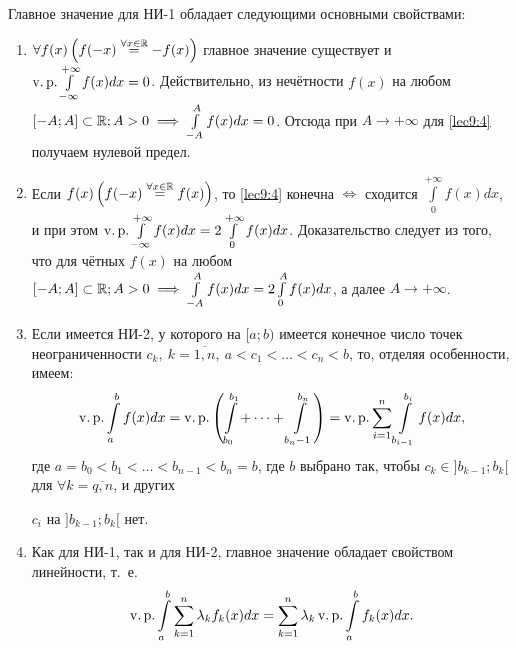 \documentclass[../../main.tex]{subfiles}
\begin{document}
Главное значение для НИ-1 обладает следующими основными свойствами:
\begin{enumerate}[label=\arabic*$^{\circ}$.]
\item
$ \forall f(x) \left(f(-x) \stackrel{\forall x \in \mathbb{R}}{=} -f(x) \right) $
главное значение существует и $\operatorname{v.p.}\int\limits_{-\infty}^{+\infty}f(x)dx=0$.
Действительно, из нечётности $ f(x) $ на любом $ [-A; A] \subset \mathbb{R}; A > 0 
\implies \int\limits_{-A}^A f(x) dx = 0$. Отсюда при $ A \to +\infty $ для
\eqref{lec9:4} получаем нулевой предел.
\item
Если $ f(x) \left(f(-x) \stackrel{\forall x \in \mathbb{R}}{=} f(x) \right) $, то
\eqref{lec9:4} конечна $ \iff $ сходится $ \int\limits_0^{+\infty}f(x)dx $, и 
при этом $ \operatorname{v.p.} \int\limits_{-\infty}^{+\infty} f(x) dx = 
2\int\limits_0^{+\infty} f(x) dx$. Доказательство следует из того, что для
чётных $ f(x) $ на любом $ [-A; A] \subset \mathbb{R}; A > 0 
\implies \int\limits_{-A}^A f(x) dx = 2\int\limits_0^A f(x) dx$, а далее 
$ A \to +\infty $.
\item
Если имеется НИ-2, у которого на $ [a; b) $ имеется конечное число точек
неограниченности $ c_k,\ k = \overline{1,n},\ a < c_1 < \dots <
c_n < b $, то, отделяя особенности, имеем: \[\operatorname{v.p.} \int\limits_a^b f(x) dx = 
\operatorname{v.p.} \left(\int\limits_{b_0}^{b_1} + \dots + \int\limits_{b_n - 1}^{b_n}
\right) = \operatorname{v.p.} \sum\limits_{i = 1}^n \int\limits_{b_{i - 1}}^{b_i} f(x)dx, \]
где $ a = b_0 < b_1 < \dots < b_{n - 1} < b_n = b $, где $ b $ выбрано так, 
чтобы $ c_k \in ]b_{k - 1}; b_k[ $ для $\forall k = \overline{q, n}$, и других

$ c_i $ 
на $ ]b_{k - 1}; b_k[ $ нет.
\item
Как для НИ-1, так и для НИ-2, главное значение обладает свойством линейности,
т.~е. \[\operatorname{v.p.} \int\limits_a^b \sum\limits_{k = 1}^n \lambda_kf_k(x)dx =
\sum\limits_{k = 1}^n \lambda_k \operatorname{v.p.} \int\limits_a^b f_k(x)dx.\]
\end{enumerate}
\end{document}
